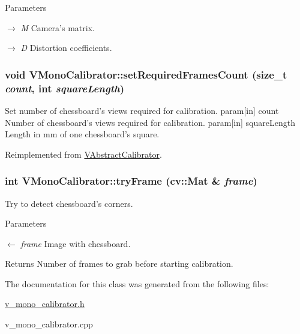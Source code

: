 \begin{DoxyParams}{Parameters}
\item[\mbox{$\rightarrow$} {\em M}]Camera's matrix. \item[\mbox{$\rightarrow$} {\em D}]Distortion coefficients. \end{DoxyParams}
\hypertarget{classVMonoCalibrator_ab3b2f7b28e77094385046d9eb53569ce}{
\subsubsection[{setRequiredFramesCount}]{\setlength{\rightskip}{0pt plus 5cm}void VMonoCalibrator::setRequiredFramesCount (size\_\-t {\em count}, \/  int {\em squareLength})}}
\label{classVMonoCalibrator_ab3b2f7b28e77094385046d9eb53569ce}
Set number of chessboard's views required for calibration. param\mbox{[}in\mbox{]} count Number of chessboard's views required for calibration. param\mbox{[}in\mbox{]} squareLength Length in mm of one chessboard's square. 

Reimplemented from \hyperlink{classVAbstractCalibrator_a2c6ac60861d16f185930e7fbf09483f8}{VAbstractCalibrator}.

\hypertarget{classVMonoCalibrator_a026938d74f2c8c2c6df06f8e50270b16}{
\subsubsection[{tryFrame}]{\setlength{\rightskip}{0pt plus 5cm}int VMonoCalibrator::tryFrame (cv::Mat \& {\em frame})}}
\label{classVMonoCalibrator_a026938d74f2c8c2c6df06f8e50270b16}
Try to detect chessboard's corners. 
\begin{DoxyParams}{Parameters}
\item[\mbox{$\leftarrow$} {\em frame}]Image with chessboard. \end{DoxyParams}
\begin{DoxyReturn}{Returns}
Number of frames to grab before starting calibration. 
\end{DoxyReturn}


The documentation for this class was generated from the following files:\begin{DoxyCompactItemize}
\item 
\hyperlink{v__mono__calibrator_8h}{v\_\-mono\_\-calibrator.h}\item 
v\_\-mono\_\-calibrator.cpp\end{DoxyCompactItemize}
